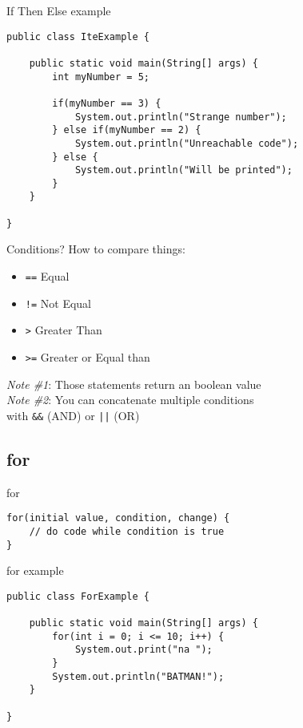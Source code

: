 \begin{frame}[fragile]{{\huge I}f {\huge T}hen {\huge E}lse example}
\begin{lstlisting}
public class IteExample {

	public static void main(String[] args) {
		int myNumber = 5;
		
		if(myNumber == 3) {
			System.out.println("Strange number");
		} else if(myNumber == 2) {
			System.out.println("Unreachable code");
		} else {
			System.out.println("Will be printed");
		}
	}
    
}
\end{lstlisting}
\end{frame}

\begin{frame}{Conditions?}
How to compare things:
\begin{itemize}
    \item \texttt{==} Equal
    \item \texttt{!=} Not Equal
    \item \texttt{>} Greater Than
    \item \texttt{>=} Greater or Equal than
\end{itemize}

\textit{Note \#1}: Those statements return an boolean value \\
\textit{Note \#2}: You can concatenate multiple conditions\\ with \texttt{\&\&} (AND) or \texttt{||} (OR)
\end{frame}

\subsection{for}
\begin{frame}[fragile]{for}
\begin{lstlisting}
for(initial value, condition, change) {
	// do code while condition is true
}
\end{lstlisting}
\end{frame}

\begin{frame}[fragile]{for example}
\begin{lstlisting}
public class ForExample {

	public static void main(String[] args) {
		for(int i = 0; i <= 10; i++) {
			System.out.print("na ");
		}
		System.out.println("BATMAN!");
	}
    
}
\end{lstlisting}
\end{frame}

